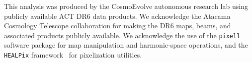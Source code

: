 \documentclass[twocolumn,showpacs,preprintnumbers,amsmath,amssymb,floatfix,prd]{revtex4-2}
\begin{document}
\begin{acknowledgments}
This analysis was produced by the CosmoEvolve autonomous research lab
using publicly available ACT DR6 data products.  We acknowledge the
Atacama Cosmology Telescope collaboration for making the DR6 maps,
beams, and associated products publicly available.  We acknowledge the
use of the \texttt{pixell} software package for map manipulation and
harmonic-space operations, and the \texttt{HEALPix}
framework~\cite{Gorski2005} for pixelization utilities.
\end{acknowledgments}


\end{document}
